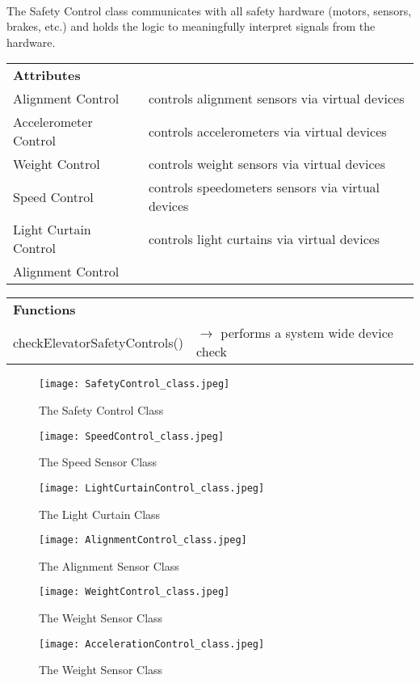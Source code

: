 \documentclass[12pt]{article}
\begin{document}
	\paragraph{} The Safety Control class communicates with all safety hardware (motors, sensors, brakes, etc.)
	and holds the logic to meaningfully interpret signals from the hardware.
	\begin{table}[H]
		\begin{tabular}{lp{12cm}}
			\textbf{Attributes}     & \\ 
			Alignment Control       & controls alignment sensors via virtual devices \\
		   	Accelerometer Control   & controls accelerometers via virtual devices \\
			Weight Control          & controls weight sensors via virtual devices \\
			Speed Control           & controls speedometers sensors via virtual devices \\
			Light Curtain Control   & controls light curtains via virtual devices \\
			Alignment Control   &
		\end{tabular}
	\end{table}     
	\begin{table}[H]
		\begin{tabular}{lp{12cm}}
			\textbf{Functions}             & \\
			checkElevatorSafetyControls()  & $\rightarrow$ performs a system wide device check\\
		\end{tabular}
	\end{table}
    \begin{figure}[H]
  		\centerline{\texttt{[image: SafetyControl\_class.jpeg]}}
  		\caption{The Safety Control Class}
  		\label{fig:SafetyControl_class}
	\end{figure}
    \begin{figure}[H]
  		\centerline{\texttt{[image: SpeedControl\_class.jpeg]}}
  		\caption{The Speed Sensor Class}
  		\label{fig:speedSensor_class}
	\end{figure}
    \begin{figure}[H]
  		\centerline{\texttt{[image: LightCurtainControl\_class.jpeg]}}
  		\caption{The Light Curtain Class}
  		\label{fig:LightCurtainSensor_class}
	\end{figure}
    \begin{figure}[H]
  		\centerline{\texttt{[image: AlignmentControl\_class.jpeg]}}
  		\caption{The Alignment Sensor Class}
  		\label{fig:AlignmentSensor_class}
	\end{figure}
    \begin{figure}[H]
  		\centerline{\texttt{[image: WeightControl\_class.jpeg]}}
  		\caption{The Weight Sensor Class}
  		\label{fig:WeightSensor_class}
	\end{figure}
    \begin{figure}[H]
  		\centerline{\texttt{[image: AccelerationControl\_class.jpeg]}}
  		\caption{The Weight Sensor Class}
  		\label{fig:Accelerometer_class}
	\end{figure}
\pagebreak	
\end{document}
